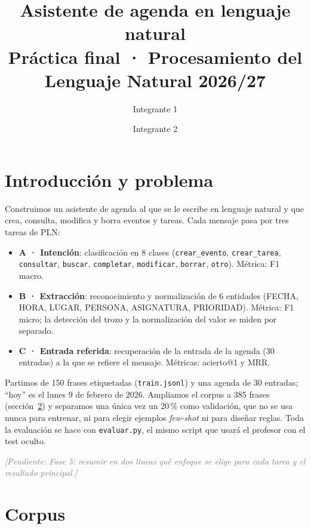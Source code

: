 \documentclass[10pt,a4paper]{article}
\title{Asistente de agenda en lenguaje natural\\\large Práctica final · Procesamiento del Lenguaje Natural 2026/27}
\author{Integrante 1 \and Integrante 2}
\date{}
\newcommand{\cod}[1]{\texttt{#1}}
\newcommand{\pendiente}[1]{\textcolor{gray}{\textit{[Pendiente: #1]}}}
\begin{document}
\maketitle

\section{Introducción y problema}\label{sec:intro}

Construimos un asistente de agenda al que se le escribe en lenguaje natural y que crea, consulta, modifica y borra eventos y tareas. Cada mensaje pasa por tres tareas de PLN:
\begin{itemize}
  \item \textbf{A · Intención}: clasificación en 8 clases (\cod{crear\_evento}, \cod{crear\_tarea}, \cod{consultar}, \cod{buscar}, \cod{completar}, \cod{modificar}, \cod{borrar}, \cod{otro}). Métrica: F1 macro.
  \item \textbf{B · Extracción}: reconocimiento y normalización de 6 entidades (FECHA, HORA, LUGAR, PERSONA, ASIGNATURA, PRIORIDAD). Métrica: F1 micro; la detección del trozo y la normalización del valor se miden por separado.
  \item \textbf{C · Entrada referida}: recuperación de la entrada de la agenda (30 entradas) a la que se refiere el mensaje. Métricas: acierto@1 y MRR.
\end{itemize}
Partimos de 150 frases etiquetadas (\cod{train.jsonl}) y una agenda de 30 entradas; ``hoy'' es el lunes 9 de febrero de 2026. Ampliamos el corpus a 385 frases (sección~\ref{sec:corpus}) y separamos una única vez un 20\,\% como validación, que no se usa nunca para entrenar, ni para elegir ejemplos \textit{few-shot} ni para diseñar reglas. Toda la evaluación se hace con \cod{evaluar.py}, el mismo script que usará el profesor con el test oculto.

\pendiente{Fase 5: resumir en dos líneas qué enfoque se elige para cada tarea y el resultado principal.}

\section{Corpus}\label{sec:corpus}
\end{document}
